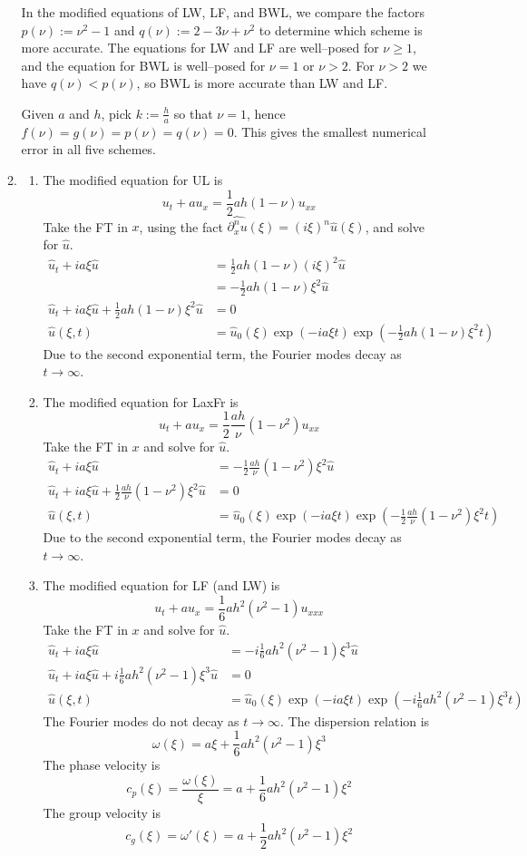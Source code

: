 \documentclass{article}
\newcommand{\ptl}{\partial}
\begin{document}
\begin{enumerate}
\begin{enumerate}
	In the modified equations of LW, LF, and BWL, we compare the factors $p(\nu):=\nu^2-1$ and $q(\nu):=2-3\nu+\nu^2$ to determine which scheme is more accurate. The equations for LW and LF are well--posed for $\nu\ge1$, and the equation for BWL is well--posed for $\nu=1$ or $\nu>2$. For $\nu>2$ we have $q(\nu)<p(\nu)$, so BWL is more accurate than LW and LF.
	
	Given $a$ and $h$, pick $k:=\frac ha$ so that $\nu=1$, hence $f(\nu)=g(\nu)=p(\nu)=q(\nu)=0$. This gives the smallest numerical error in all five schemes.
	
	
	\item 
	
	\begin{enumerate}
		
		
		\item The modified equation for UL is
		$$u_t + au_x = \frac12ah(1-\nu)u_{xx}$$
		Take the FT in $x$, using the fact $\widehat{\ptl_x^nu}(\xi)=(i\xi)^n\hat u(\xi)$, and solve for $\hat u$.
		\begin{align*}
			\hat u_t + ia\xi\hat u &= \frac12ah(1-\nu)(i\xi)^2\hat u\\
			&= -\frac12ah(1-\nu)\xi^2\hat u\\
			\hat u_t + ia\xi\hat u + \frac12ah(1-\nu)\xi^2\hat u &= 0\\
			\hat u(\xi,t) &= \hat u_0(\xi)\exp(-ia\xi t)\exp(-\frac12ah(1-\nu)\xi^2t)
		\end{align*}
		Due to the second exponential term, the Fourier modes decay as $t\to\infty$.
		
		
		\item The modified equation for LaxFr is
		$$u_t + au_x = \frac12\frac{ah}{\nu}(1-\nu^2)u_{xx}$$
		Take the FT in $x$ and solve for $\hat u$.
		\begin{align*}
			\hat u_t + ia\xi\hat u &= -\frac12\frac{ah}{\nu}(1-\nu^2)\xi^2\hat u\\
			\hat u_t + ia\xi\hat u + \frac12\frac{ah}{\nu}(1-\nu^2)\xi^2\hat u &= 0\\
			\hat u(\xi,t) &= \hat u_0(\xi)\exp(-ia\xi t)\exp(-\frac12\frac{ah}{\nu}(1-\nu^2)\xi^2t)
		\end{align*}
		Due to the second exponential term, the Fourier modes decay as $t\to\infty$.
		
		
		\item The modified equation for LF (and LW) is
		$$u_t + au_x = \frac16ah^2(\nu^2-1)u_{xxx}$$
		Take the FT in $x$ and solve for $\hat u$.
		\begin{align*}
			\hat u_t + ia\xi\hat u &= -i\frac16ah^2(\nu^2-1)\xi^3\hat u\\
			\hat u_t + ia\xi\hat u + i\frac16ah^2(\nu^2-1)\xi^3\hat u &= 0\\
			\hat u(\xi,t) &= \hat u_0(\xi)\exp(-ia\xi t)\exp(-i\frac16ah^2(\nu^2-1)\xi^3t)
		\end{align*}
		The Fourier modes do not decay as $t\to\infty$. The dispersion relation is
		$$\omega(\xi) = a\xi + \frac16ah^2(\nu^2-1)\xi^3$$
		The phase velocity is
		$$c_p(\xi) = \frac{\omega(\xi)}{\xi} = a + \frac16ah^2(\nu^2-1)\xi^2$$
		The group velocity is
		$$c_g(\xi) = \omega'(\xi) = a + \frac12ah^2(\nu^2-1)\xi^2$$
		

\end{enumerate}
\end{enumerate}
\end{enumerate}
\end{document}
